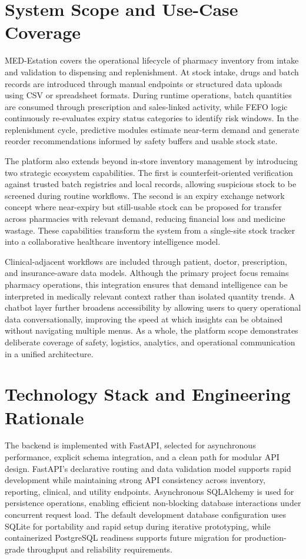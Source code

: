 \documentclass[12pt,a4paper]{report}
\begin{document}
\chapter{System Scope and Use-Case Coverage}
MED-Estation covers the operational lifecycle of pharmacy inventory from intake and validation to dispensing and replenishment. At stock intake, drugs and batch records are introduced through manual endpoints or structured data uploads using CSV or spreadsheet formats. During runtime operations, batch quantities are consumed through prescription and sales-linked activity, while FEFO logic continuously re-evaluates expiry status categories to identify risk windows. In the replenishment cycle, predictive modules estimate near-term demand and generate reorder recommendations informed by safety buffers and usable stock state.

The platform also extends beyond in-store inventory management by introducing two strategic ecosystem capabilities. The first is counterfeit-oriented verification against trusted batch registries and local records, allowing suspicious stock to be screened during routine workflows. The second is an expiry exchange network concept where near-expiry but still-usable stock can be proposed for transfer across pharmacies with relevant demand, reducing financial loss and medicine wastage. These capabilities transform the system from a single-site stock tracker into a collaborative healthcare inventory intelligence model.

Clinical-adjacent workflows are included through patient, doctor, prescription, and insurance-aware data models. Although the primary project focus remains pharmacy operations, this integration ensures that demand intelligence can be interpreted in medically relevant context rather than isolated quantity trends. A chatbot layer further broadens accessibility by allowing users to query operational data conversationally, improving the speed at which insights can be obtained without navigating multiple menus. As a whole, the platform scope demonstrates deliberate coverage of safety, logistics, analytics, and operational communication in a unified architecture.

\chapter{Technology Stack and Engineering Rationale}
The backend is implemented with FastAPI, selected for asynchronous performance, explicit schema integration, and a clean path for modular API design. FastAPI’s declarative routing and data validation model supports rapid development while maintaining strong API consistency across inventory, reporting, clinical, and utility endpoints. Asynchronous SQLAlchemy is used for persistence operations, enabling efficient non-blocking database interactions under concurrent request load. The default development database configuration uses SQLite for portability and rapid setup during iterative prototyping, while containerized PostgreSQL readiness supports future migration for production-grade throughput and reliability requirements.
\end{document}
